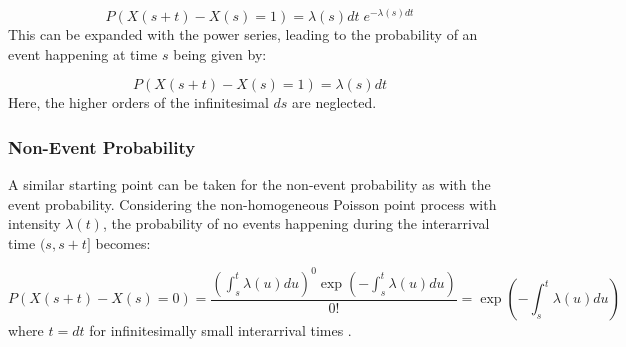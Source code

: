 \begin{equation}
    P(X(s+t) - X(s) = 1) = \lambda(s)dt \; e^{-\lambda(s)dt}
\end{equation}
This can be expanded with the power series, leading to the probability of an event happening at time $s$ being given by:

\begin{equation}
    P(X(s+t) - X(s) = 1) = \lambda(s) dt
\end{equation}
Here, the higher orders of the infinitesimal $ds$ are neglected.

\subsubsection{Non-Event Probability}
\label{sec:Method:Poisson:NonEventProbability}
A similar starting point can be taken for the non-event probability as with the event probability.
Considering the non-homogeneous Poisson point process with intensity $\lambda(t)$, the probability of no events happening during the interarrival time $(s, s+t]$ becomes:

\begin{equation}
    P(X(s+t) - X(s) = 0) 
    = 
    \frac{\left(\int_s^t \lambda(u)du \right)^0 \exp \left(- \int_s^t \lambda(u)du\right)}{0!}
    = 
    \exp \left(- \int_s^t \lambda(u)du\right)
\end{equation}
where $t = dt$ for infinitesimally small interarrival times \cite{Tommerup2021LearningNetworks}.
